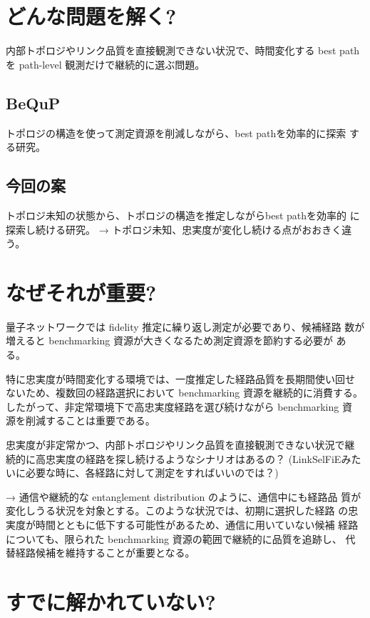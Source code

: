 \documentclass[conference]{IEEEtran}
\begin{document}
\section{どんな問題を解く?}
\label{sec:org6e664c5}
内部トポロジやリンク品質を直接観測できない状況で、時間変化する best path を path-level 観測だけで継続的に選ぶ問題。

\subsection{BeQuP}
\label{sec:orge160048}
トポロジの構造を使って測定資源を削減しながら、best pathを効率的に探索
する研究。

\subsection{今回の案}
\label{sec:org0fbaef4}
トポロジ未知の状態から、トポロジの構造を推定しながらbest pathを効率的
に探索し続ける研究。
→ トポロジ未知、忠実度が変化し続ける点がおおきく違う。

\section{なぜそれが重要?}
\label{sec:org66232e4}
量子ネットワークでは fidelity 推定に繰り返し測定が必要であり、候補経路
数が増えると benchmarking 資源が大きくなるため測定資源を節約する必要が
ある。

特に忠実度が時間変化する環境では、一度推定した経路品質を長期間使い回せ
ないため、複数回の経路選択において benchmarking 資源を継続的に消費する。
したがって、非定常環境下で高忠実度経路を選び続けながら benchmarking 資
源を削減することは重要である。


忠実度が非定常かつ、内部トポロジやリンク品質を直接観測できない状況で継
続的に高忠実度の経路を探し続けるようなシナリオはあるの？
(LinkSelFiEみたいに必要な時に、各経路に対して測定をすればいいのでは？)

→ 通信や継続的な entanglement distribution のように、通信中にも経路品
質が変化しうる状況を対象とする。このような状況では、初期に選択した経路
の忠実度が時間とともに低下する可能性があるため、通信に用いていない候補
経路についても、限られた benchmarking 資源の範囲で継続的に品質を追跡し、
代替経路候補を維持することが重要となる。


\section{すでに解かれていない?}
\label{sec:org1ed9edb}
\end{document}
